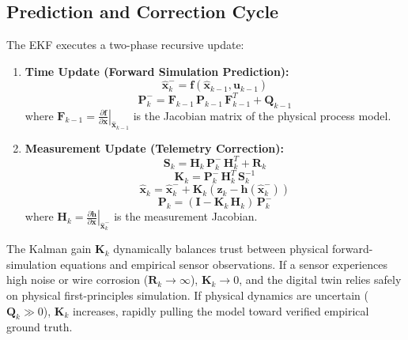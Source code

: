 \subsection{Prediction and Correction Cycle}
The EKF executes a two-phase recursive update:
\begin{enumerate}
    \item \textbf{Time Update (Forward Simulation Prediction):}
    \begin{equation}
    \hat{\mathbf{x}}_k^- = \mathbf{f}(\hat{\mathbf{x}}_{k-1}, \mathbf{u}_{k-1})
    \label{eq:ekf_pred_state}
    \end{equation}
    \begin{equation}
    \mathbf{P}_k^- = \mathbf{F}_{k-1} \, \mathbf{P}_{k-1} \, \mathbf{F}_{k-1}^T + \mathbf{Q}_{k-1}
    \label{eq:ekf_pred_cov}
    \end{equation}
    where $\mathbf{F}_{k-1} = \left. \frac{\partial \mathbf{f}}{\partial \mathbf{x}} \right|_{\hat{\mathbf{x}}_{k-1}}$ is the Jacobian matrix of the physical process model.
    \item \textbf{Measurement Update (Telemetry Correction):}
    \begin{equation}
    \mathbf{S}_k = \mathbf{H}_k \, \mathbf{P}_k^- \, \mathbf{H}_k^T + \mathbf{R}_k
    \label{eq:ekf_innovation_cov}
    \end{equation}
    \begin{equation}
    \mathbf{K}_k = \mathbf{P}_k^- \, \mathbf{H}_k^T \, \mathbf{S}_k^{-1}
    \label{eq:ekf_gain}
    \end{equation}
    \begin{equation}
    \hat{\mathbf{x}}_k = \hat{\mathbf{x}}_k^- + \mathbf{K}_k \left( \mathbf{z}_k - \mathbf{h}(\hat{\mathbf{x}}_k^-) \right)
    \label{eq:ekf_state_update}
    \end{equation}
    \begin{equation}
    \mathbf{P}_k = (\mathbf{I} - \mathbf{K}_k \, \mathbf{H}_k) \, \mathbf{P}_k^-
    \label{eq:ekf_cov_update}
    \end{equation}
    where $\mathbf{H}_k = \left. \frac{\partial \mathbf{h}}{\partial \mathbf{x}} \right|_{\hat{\mathbf{x}}_k^-}$ is the measurement Jacobian.
\end{enumerate}

The Kalman gain $\mathbf{K}_k$ dynamically balances trust between physical forward-simulation equations and empirical sensor observations. If a sensor experiences high noise or wire corrosion ($\mathbf{R}_k \to \infty$), $\mathbf{K}_k \to 0$, and the digital twin relies safely on physical first-principles simulation. If physical dynamics are uncertain ($\mathbf{Q}_k \gg 0$), $\mathbf{K}_k$ increases, rapidly pulling the model toward verified empirical ground truth.

